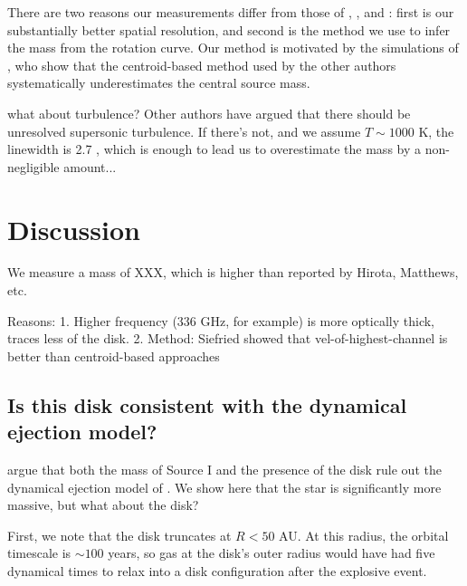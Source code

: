 \documentclass[twocolumn]{aastex61}
\begin{document}
There are two reasons our measurements differ from those of \citet{Plambeck2016a},
\citet{Hirota2014a}, and \citet{Matthews2010a}: first is our substantially better
spatial resolution, and second is the method we use to infer the mass from the
rotation curve.  Our method is motivated by the simulations of \citet{Seifried2016a},
who show that the centroid-based method used by the other authors systematically
underestimates the central source mass.

what about turbulence?  Other authors have argued that there should be unresolved
supersonic turbulence.  If there's not, and we assume $T\sim1000$ K, the
linewidth is 2.7 \kms, which is enough to lead us to overestimate the mass by a
non-negligible amount...


\section{Discussion}
We measure a mass of XXX, which is higher than reported by Hirota, Matthews, etc.

Reasons:
1. Higher frequency (336 GHz, for example) is more optically thick, traces less
of the disk.
2. Method: Siefried showed that vel-of-highest-channel is better than centroid-based
approaches

\subsection{Is this disk consistent with the dynamical ejection model?}
\citet{Plambeck2016a} argue that both the mass of Source I and the presence of the disk
rule out the dynamical ejection model of \citet{Bally2011a}.  We show here that
the star is significantly more massive, but what about the disk?

First, we note that the disk truncates at $R<50$ AU.  At this radius, the
orbital timescale is $\sim100$ years, so gas at the disk's outer radius would
have had five dynamical times to relax into a disk configuration after the
explosive event.


\end{document}
